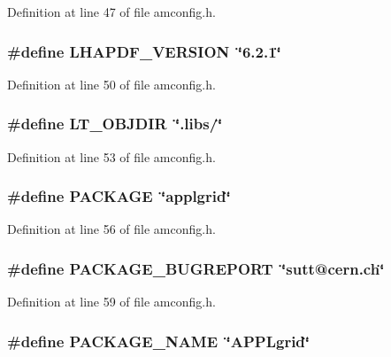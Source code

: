 Definition at line 47 of file amconfig.h.
\subsubsection[{LHAPDF\_\-VERSION}]{\setlength{\rightskip}{0pt plus 5cm}\#define LHAPDF\_\-VERSION~\char`\"{}6.2.1\char`\"{}}\label{amconfig_8h_a1e2b9dccd5894f85f73955cdfbc4bb9a}


Definition at line 50 of file amconfig.h.
\subsubsection[{LT\_\-OBJDIR}]{\setlength{\rightskip}{0pt plus 5cm}\#define LT\_\-OBJDIR~\char`\"{}.libs/\char`\"{}}\label{amconfig_8h_ac2d5925d76379847dd9fc4747b061659}


Definition at line 53 of file amconfig.h.
\subsubsection[{PACKAGE}]{\setlength{\rightskip}{0pt plus 5cm}\#define PACKAGE~\char`\"{}applgrid\char`\"{}}\label{amconfig_8h_aca8570fb706c81df371b7f9bc454ae03}


Definition at line 56 of file amconfig.h.
\subsubsection[{PACKAGE\_\-BUGREPORT}]{\setlength{\rightskip}{0pt plus 5cm}\#define PACKAGE\_\-BUGREPORT~\char`\"{}sutt@cern.ch\char`\"{}}\label{amconfig_8h_a1d1d2d7f8d2f95b376954d649ab03233}


Definition at line 59 of file amconfig.h.
\subsubsection[{PACKAGE\_\-NAME}]{\setlength{\rightskip}{0pt plus 5cm}\#define PACKAGE\_\-NAME~\char`\"{}APPLgrid\char`\"{}}\label{amconfig_8h_a1c0439e4355794c09b64274849eb0279}


